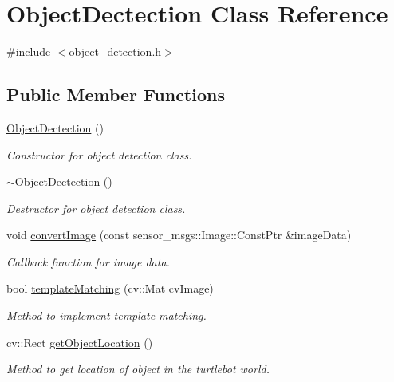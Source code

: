 \hypertarget{classObjectDectection}{}\section{Object\+Dectection Class Reference}
\label{classObjectDectection}


{\ttfamily \#include $<$object\+\_\+detection.\+h$>$}

\subsection*{Public Member Functions}
\begin{DoxyCompactItemize}
\item 
\hyperlink{classObjectDectection_ab0aace87e85b603e96a66e94c936fc1b}{Object\+Dectection} ()
\begin{DoxyCompactList}\small\item\em Constructor for object detection class. \end{DoxyCompactList}\item 
\hyperlink{classObjectDectection_a97840a69d8c8a6096db6cc8dea0b9e01}{$\sim$\+Object\+Dectection} ()
\begin{DoxyCompactList}\small\item\em Destructor for object detection class. \end{DoxyCompactList}\item 
void \hyperlink{classObjectDectection_abaed4737bbd593f1c9e75e56b5ae7db3}{convert\+Image} (const sensor\+\_\+msgs\+::\+Image\+::\+Const\+Ptr \&image\+Data)
\begin{DoxyCompactList}\small\item\em Callback function for image data. \end{DoxyCompactList}\item 
bool \hyperlink{classObjectDectection_abfb053098fb4ac31367ff97e4eec1f5d}{template\+Matching} (cv\+::\+Mat cv\+Image)
\begin{DoxyCompactList}\small\item\em Method to implement template matching. \end{DoxyCompactList}\item 
cv\+::\+Rect \hyperlink{classObjectDectection_a41286e52132960adfd7778893ab5166a}{get\+Object\+Location} ()
\begin{DoxyCompactList}\small\item\em Method to get location of object in the turtlebot world. \end{DoxyCompactList}\end{DoxyCompactItemize}


